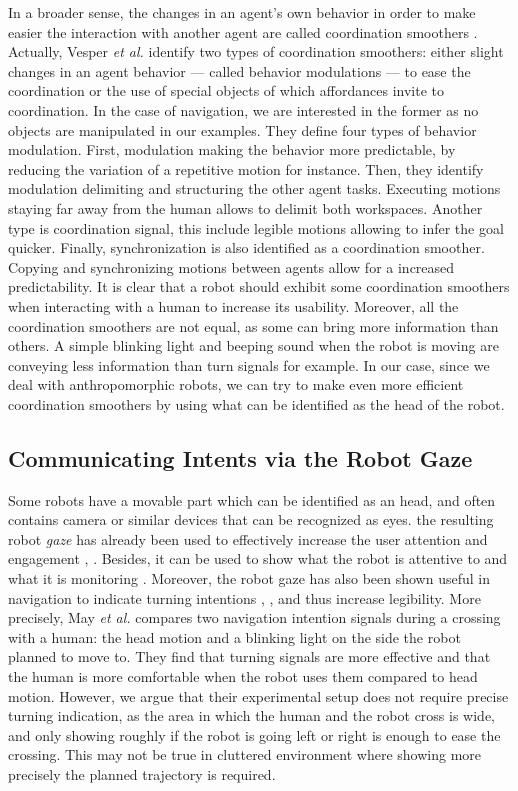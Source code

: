 \documentclass[a4paper,11pt,twoside]{StyleThese}
\begin{document}
In a broader sense, the changes in an agent's own behavior in order to make easier the interaction with another agent are called coordination smoothers \cite{vesper_minimal_2010}. Actually, Vesper \textit{et al.} identify two types of coordination smoothers: either slight changes in an agent behavior --- called behavior modulations --- to ease the coordination or the use of special objects of which affordances invite to coordination. In the case of navigation, we are interested in the former as no objects are manipulated in our examples. They define four types of behavior modulation. First, modulation making the behavior more predictable, by reducing the variation of a repetitive motion for instance. Then, they identify modulation delimiting and structuring the other agent tasks. Executing motions staying far away from the human allows to delimit both workspaces. Another type is coordination signal, this include legible motions allowing to infer the goal quicker. Finally, synchronization is also identified as a coordination smoother. Copying and synchronizing motions between agents allow for a increased predictability. It is clear that a robot should exhibit some coordination smoothers when interacting with a human to increase its usability. Moreover, all the coordination smoothers are not equal, as some can bring more information than others. A simple blinking light and beeping sound when the robot is moving are conveying less information than turn signals for example. In our case, since we deal with anthropomorphic robots, we can try to make even more efficient coordination smoothers by using what can be identified as the head of the robot.

\subsection{Communicating Intents via the Robot Gaze}
Some robots have a movable part which can be identified as an head, and often contains camera or similar devices that can be recognized as eyes. the resulting robot \textit{gaze} has already been used to effectively increase the user attention and engagement \cite{mutlu_storytelling_2006}, \cite{zaraki_designing_2014}. Besides, it can be used to show what the robot is attentive to and what it is monitoring \cite{breazeal2005effects}. Moreover, the robot gaze has also been shown useful in navigation to indicate turning intentions \cite{lu_towards_2013}, \cite{may_show_2015}, and thus increase legibility. More precisely, May \textit{et al.} compares two navigation intention signals during a crossing with a human: the head motion and a blinking light on the side the robot planned to move to. They find that turning signals are more effective and that the human is more comfortable when the robot uses them compared to head motion. However, we argue that their experimental setup does not require precise turning indication, as the area in which the human and the robot cross is wide, and only showing roughly if the robot is going left or right is enough to ease the crossing. This may not be true in cluttered environment where showing more precisely the planned trajectory is required. 
\end{document}
